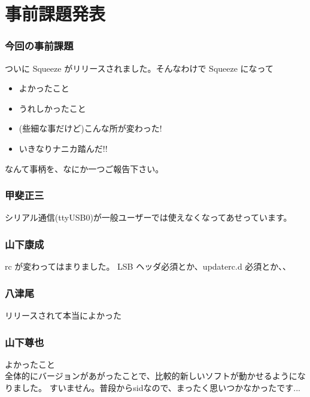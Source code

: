 \documentclass[cjk,dvipdfmx,12pt,%
hyperref={bookmarks=true,bookmarksnumbered=true,bookmarksopen=false,%
colorlinks=false,%
pdftitle={第 44 回 関西 Debian 勉強会},%
pdfauthor={倉敷・のがた・佐々木},%
pdfsubject={資料},%
}]{beamer}
\begin{document}
\section{事前課題発表}




\begin{frame}[fragile]
\frametitle{今回の事前課題}

\begin{block}{ ついに Squeeze がリリースされました。そんなわけで Squeeze になって }
     \begin{itemize}
      \item よかったこと
      \item うれしかったこと
      \item (些細な事だけど)こんな所が変わった!
      \item いきなりナニカ踏んだ!!
     \end{itemize}
     なんて事柄を、なにか一つご報告下さい。
\end{block}

\end{frame}


\begin{frame}[fragile]
  \frametitle{ 甲斐正三 }
  シリアル通信(ttyUSB0)が一般ユーザーでは使えなくなってあせっています。
\end{frame}

\begin{frame}[fragile]
  \frametitle{ 山下康成 }
  rc が変わってはまりました。
  LSB ヘッダ必須とか、updaterc.d 必須とか、、
\end{frame}

\begin{frame}[fragile]
  \frametitle{ 八津尾 }
  リリースされて本当によかった
\end{frame}

\begin{frame}[fragile]
  \frametitle{ 山下尊也 }
  \begin{description}
  \item {よかったこと} \\
    全体的にバージョンがあがったことで、比較的新しいソフトが動かせるようになりました。
    すいません。普段からsidなので、まったく思いつかなかったです...
  \end{description}
\end{frame}
\end{document}
